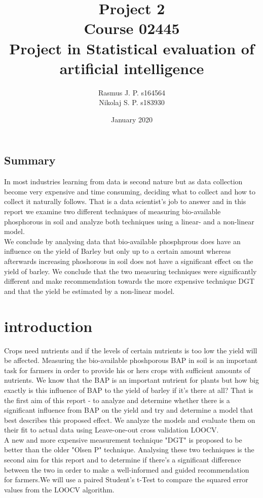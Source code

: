 \documentclass{article}
\begin{document}
\begin{titlepage}
	
	
	\title{Project 2 \\ Course 02445 \\ Project in Statistical evaluation of \\ artificial intelligence }
	\author{Rasmus J. P. s164564 \\ Nikolaj S. P. s183930}
	\date{January 2020}
	\maketitle
	
\subsection*{Summary}
In most industries learning from data is second nature but as data collection become very expensive and time consuming, deciding what to collect and how to collect it naturally follows. That is a data scientist's job to answer and in this report we examine two different techniques of measuring bio-available phosphorous in soil and analyze both techniques using a linear- and a non-linear model.\\ We conclude by analysing data that bio-available phosphprous does have an influence on the yield of Barley but only up to a certain amount whereas afterwards increasing phoshorous in soil does not have a significant effect on the yield of barley. We conclude that the two measuring techniques were significantly different and make recommendation towards the more expensive technique DGT and that the yield be estimated by a non-linear model.
	
\end{titlepage}


\section{introduction}
Crops need nutrients and if the levels of certain nutrients is too low the yield will be affected. Measuring the bio-available phoshporous BAP in soil is an important task for farmers in order to provide his or hers crops with sufficient amounts of nutrients. We know that the BAP is an important nutrient for plants but how big exactly is this influence of BAP to the yield of barley if it's there at all? That is the first aim of this report - to analyze and determine whether there is a significant influence from BAP on the yield and try and determine a model that best describes this proposed effect. We analyze the models and evaluate them on their fit to actual data using Leave-one-out cross validation LOOCV. \\ A new and more expensive measurement technique "DGT" is proposed to be better than the older "Olsen P" technique. Analysing these two techniques is the second aim for this report and to determine if there's a significant difference between the two in order to make a well-informed and guided recommendation for farmers.We will use a paired Student's t-Test to compare the squared error values from the LOOCV algorithm.
\end{document}
